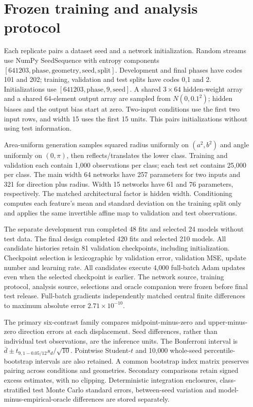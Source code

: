 \documentclass[10 pt,a 4 paper]{article}
\begin{document}
\section{Frozen training and analysis protocol}
Each replicate pairs a dataset seed and a network initialization. Random streams use NumPy SeedSequence with entropy components $[641203,\mathrm{phase},\mathrm{geometry},\mathrm{seed},\mathrm{split}]$. Development and final phases have codes 101 and 202; training, validation and test splits have codes 0,1 and 2. Initializations use $[641203,\mathrm{phase},9,\mathrm{seed}]$. A shared $3\times 64$ hidden-weight array and a shared 64-element output array are sampled from $N(0,0.1^2)$; hidden biases and the output bias start at zero. Two-input conditions use the first two input rows, and width 15 uses the first 15 units. This pairs initializations without using test information.

Area-uniform generation samples squared radius uniformly on $(a^2,b^2)$ and angle uniformly on $(0,\pi)$, then reflects/translates the lower class. Training and validation each contain 1,000 observations per class; each test set contains 25,000 per class. The main width 64 networks have 257 parameters for two inputs and 321 for direction plus radius. Width 15 networks have 61 and 76 parameters, respectively. The matched architectural factor is hidden width. Conditioning computes each feature's mean and standard deviation on the training split only and applies the same invertible affine map to validation and test observations.

The separate development run completed 48 fits and selected 24 models without test data. The final design completed 420 fits and selected 210 models. All candidate histories retain 81 validation checkpoints, including initialization. Checkpoint selection is lexicographic by validation error, validation MSE, update number and learning rate. All candidates execute 4,000 full-batch Adam updates even when the selected checkpoint is earlier. The network source, training protocol, analysis source, selections and oracle companion were frozen before final test release. Full-batch gradients independently matched central finite differences to maximum absolute error $2.71\times 10^{-10}$.

The primary six-contrast family compares midpoint-minus-zero and upper-minus-zero direction errors at each displacement. Seed differences, rather than individual test observations, are the inference units. The Bonferroni interval is $\bar d\pm t_{9,1-0.05/12}s_d/\sqrt{10}$. Pointwise Student-$t$ and 10,000 whole-seed percentile-bootstrap intervals are also retained. A common bootstrap index matrix preserves pairing across conditions and geometries. Secondary comparisons retain signed excess estimates, with no clipping. Deterministic integration enclosures, class-stratified test Monte Carlo standard errors, between-seed variation and model-minus-empirical-oracle differences are stored separately.
\end{document}
